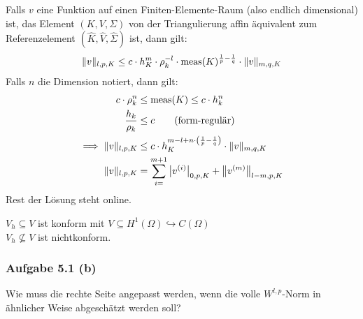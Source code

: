 \begin{bemerkung}
	Falls $v$ eine Funktion auf einen Finiten-Elemente-Raum (also endlich dimensional) ist, das Element $(K,V,\Sigma)$ von der Triangulierung affin äquivalent zum Referenzelement $(\hat{K},\hat{V},\hat{\Sigma})$ ist, dann gilt:
	\begin{align*}
		\Vert v\Vert_{l,p,K}\leq c\cdot h_K^m\cdot\rho_k^{-l}\cdot\operatorname{meas}(K)^{\frac{1}{p}-\frac{1}{q}}\cdot\Vert v\Vert_{m,q,K}
	\end{align*}
	Falls $n$ die Dimension notiert, dann gilt:
	\begin{align*}
		c\cdot \rho_k^n&\leq\operatorname{meas}(K)\leq c\cdot h_k^n\\
		\frac{h_k}{\rho_k}&\leq c\qquad\text{(form-regulär)}\\
		\implies\Vert v\Vert_{l,p,K}&\leq c\cdot h_K^{m-l+n\cdot\left(\frac{1}{p}-\frac{1}{q}\right)}\cdot\Vert v\Vert_{m,q,K}\\
		\Vert v\Vert_{l,p,K}&=\sum\limits_{i=}^{m+1}\big| v^{(i)}\big|_{0,p,K}+\big\Vert v^{(m)}\big\Vert_{l-m,p,K}
	\end{align*}
	Rest der Lösung steht online.
\end{bemerkung}

$V_h\subseteq V$ ist konform mit $V\subseteq H^1(\Omega)\hookrightarrow C(\Omega)$\\
$V_h\not\subseteq V$ ist nichtkonform.

\subsubsection{Aufgabe 5.1 (b)}
Wie muss die rechte Seite angepasst werden, wenn die volle $W^{l,p}$-Norm in ähnlicher Weise abgeschätzt werden soll?

\begin{lösung}
\end{lösung}

